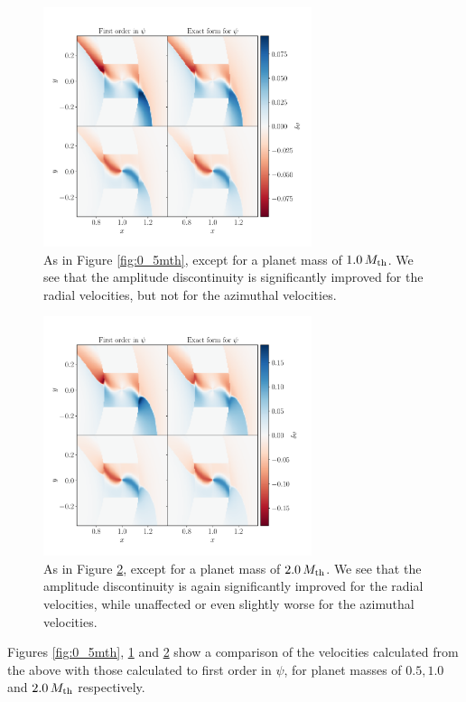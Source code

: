 \begin{figure}
    \centering
    \includegraphics[width = 0.7\textwidth]{figures/1_0_mth.pdf}
    \caption{As in Figure \ref{fig:0_5mth}, except for a planet mass of $1.0 \, M_{\rm th}$. We see that the amplitude discontinuity is significantly improved for the radial velocities, but not for the azimuthal velocities.}
    \label{fig:1_0mth}
\end{figure}
\begin{figure}
    \centering
    \includegraphics[width = 0.7\textwidth]{figures/2_0_mth.pdf}
    \caption{As in Figure \ref{fig:2_0mth}, except for a planet mass of $2.0 \, M_{\rm th}$. We see that the amplitude discontinuity is again significantly improved for the radial velocities, while unaffected or even slightly worse for the azimuthal velocities.}
    \label{fig:2_0mth}
\end{figure}
Figures \ref{fig:0_5mth}, \ref{fig:1_0mth} and \ref{fig:2_0mth} show a comparison of the velocities calculated from the above with those calculated to first order in $\psi$, for planet masses of $0.5, 1.0$ and $2.0 \, M_{\rm th}$ respectively. 

